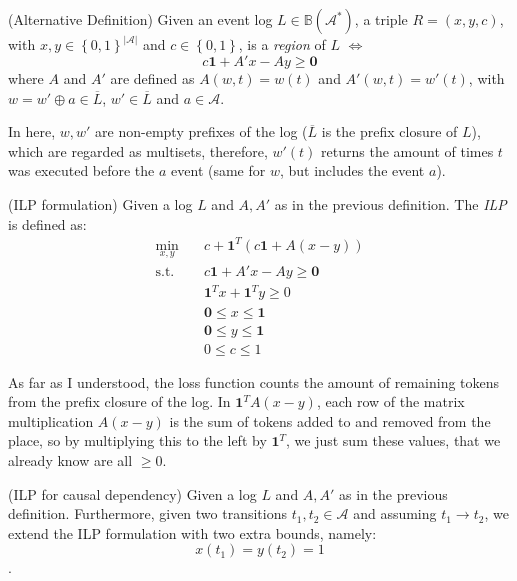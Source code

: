 \documentclass[a4paper]{report}
\begin{document}
\begin{definition}
    (Alternative Definition) Given an event log $L\in \mathbb{B}(\mathcal{A}^{*})$, a triple $R=(x,y,c)$, with $x,y \in \left\{ 0,1 \right\}^{|\mathcal{A}|}$ and $c\in \left\{0,1\right\}$, is a \emph{region} of $L$ $\iff$ \[
	c \bm{1} + A'x - Ay \ge \bm{0}
	\] where $A$ and $A'$ are defined as $A(w,t) = w(t)$ and $A'(w,t)=w'(t)$, with  $w=w'\oplus a \in \overline{L}$, $w'\in \overline{L}$ and $a\in \mathcal{A}$.
\end{definition}

In here, $w,w'$ are non-empty prefixes of the log ($\overline{L}$ is the prefix closure of $L$), which are regarded as multisets, therefore, $w'(t)$ returns the amount of times $t$ was executed before the $a$ event (same for $w$, but includes the event $a$).

\begin{definition}
    (ILP formulation) Given a log $L$ and $A, A'$ as in the previous definition. The \emph{ILP} is defined as:
    \begin{equation}
        \begin{aligned}
	    \min_{x,y} \quad & c + \bm{1}^{T}\left( c \bm{1} + A(x-y) \right) \\
	    \text{s.t.} \quad & c \bm{1} + A'x - Ay \ge \bm{0} \\
			     & \bm{1}^{T}x + \bm{1}^{T}y \ge 0 \\
			     & \bm{0} \le x\le \bm{1} \\
			     & \bm{0} \le y\le \bm{1} \\
			     & 0 \le c\le 1
        \end{aligned}
    \end{equation}
\end{definition}

As far as I understood, the loss function counts the amount of remaining tokens from the prefix closure of the log. In $\bm{1}^{T}A(x-y)$, each row of the matrix multiplication $A(x-y)$ is the sum of tokens added to and removed from the place, so by multiplying this to the left by $\bm{1}^{T}$, we just sum these values, that we already know are all $\ge 0$.

\begin{definition}
    (ILP for causal dependency) Given a log $L$ and $A, A'$ as in the previous definition. Furthermore, given two transitions $t_1,t_2\in \mathcal{A}$ and assuming $t_1\to t_2$, we extend the ILP formulation with two extra bounds, namely: \[
	x(t_1)=y(t_2)=1
    \].
\end{definition}
\end{document}
